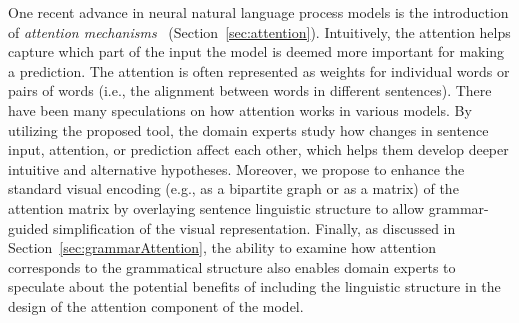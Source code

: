 One recent advance in neural natural language process models is the introduction of \emph{attention mechanisms}~\cite{VaswaniShazeerParmar2017} (Section~\ref{sec:attention}). Intuitively, the attention helps capture which part of the input the model is deemed more important for making a prediction. The attention is often represented as weights for individual words or pairs of words (i.e., the alignment between words in different sentences).
%
There have been many speculations on how attention works in various models. By utilizing the proposed tool, the domain experts study how changes in sentence input, attention, or prediction affect each other, which helps them develop deeper intuitive and alternative hypotheses. 
Moreover, we propose to enhance the standard visual encoding (e.g., as a bipartite graph or as a matrix) of the attention matrix by overlaying sentence linguistic structure to allow grammar-guided simplification of the visual representation.
%
Finally, as discussed in Section~\ref{sec:grammarAttention}, the ability to examine how attention corresponds to the grammatical structure also enables domain experts to speculate about the potential benefits of including the linguistic structure in the design of the attention component of the model.


